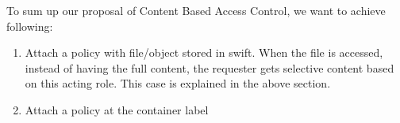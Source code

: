 To sum up our proposal of Content Based Access Control, we want to achieve following:


\begin{enumerate}

  \item Attach a policy with file/object stored in swift. When the file is accessed, instead of having the full content, the requester gets selective content based on this acting role. This case is explained in the above section.


\item Attach a policy at the container label 

\end{enumerate}










